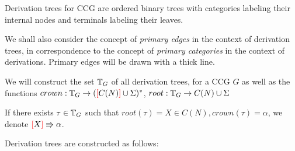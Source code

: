 \documentclass[main.tex]{subfiles}
\begin{document}
Derivation trees for CCG are ordered binary trees with categories labeling
their internal nodes and terminals labeling their leaves.

We shall also consider the concept of \emph{primary edges} in the context
of derivation trees, in correspondence to the concept of
\emph{primary categories} in the context of derivations. Primary edges
will be drawn with a thick line.

We will construct the set $ \mathbb{T}_{ G } $ of all derivation trees, for a
CCG $G$ as well
as the functions $ crown: \mathbb{T}_{ G } \rightarrow ( \textcolor{red}{[} C(N) \textcolor{red}{]} \cup \Sigma )^* $,
$ root: \mathbb{T}_{ G } \rightarrow C(N) \cup \Sigma$

If there exists $\tau \in \mathbb{T}_{ G }$ such that $root(\tau) = X \in C(N),
crown(\tau) = \alpha$, we denote $\textcolor{red}{[} X \textcolor{red}{]} \Rrightarrow \alpha$.

Derivation trees are constructed as follows:
\end{document}
